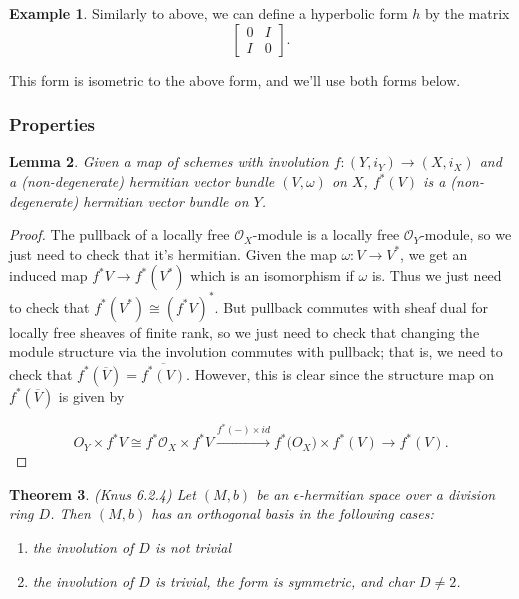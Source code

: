 \documentclass[draftthesis,tocnosub,noragright,centerchapter,10pt]{uiucthesis2009}
\newcommand{\mc}{\mathcal}
\theoremstyle{plain}
\newtheorem{lemma}{Lemma}
\newtheorem{theorem}[lemma]{Theorem}
\theoremstyle{definition}
\newtheorem{example}[lemma]{Example}
\begin{document}
\begin{example}
Similarly to above, we can define a hyperbolic form $h$ by the matrix
\[
\begin{bmatrix}
0 & I\\
I & 0
\end{bmatrix}.
\]

This form is isometric to the above form, and we'll use both forms below.
\end{example}

\subsubsection{Properties}

\begin{lemma}
Given a map of schemes with involution $f : (Y,i_Y) \rightarrow (X,i_X)$
and a (non-degenerate) hermitian vector bundle $(V,\omega)$ on $X$, $f^*(V)$ is
a (non-degenerate) hermitian
vector bundle on $Y$.
\end{lemma}


\begin{proof}
The pullback of a locally free $\mc O_X$-module is a locally free $\mc
O_Y$-module, so we just need to check that it's hermitian. Given the
map $\omega : V \rightarrow V^*$, we get an induced map $f^*V
\rightarrow f^*(V^*)$ which is an isomorphism if $\omega$ is. Thus we
just need to check that $f^*(V^*) \cong (f^*V)^*$. But pullback
commutes with sheaf dual for locally free sheaves of finite rank, so
we just need to check that changing the module structure via the
involution commutes with pullback; that is, we need to check that
$f^*(\overline V) = \overline{f^*(V)}$. However, this is clear since
the structure map on $f^*(\overline V)$ is given by

\[
O_Y \times f^*V \cong f^* \mc O_X \times f^*V \xrightarrow{f^*(-) \times id} f^*\mc(O_X) \times f^*(V)
\rightarrow f^*(V).
\]
\end{proof}

\begin{theorem} (Knus \cite{HermKnus} 6.2.4)
Let $(M,b)$ be an $\epsilon$-hermitian space over a division ring
$D$. Then $(M,b)$ has an orthogonal basis in the following cases:
\begin{enumerate}
\item the involution of $D$ is not trivial
\item the involution of $D$ is trivial, the form is symmetric, and
  char $D \neq 2$.
\end{enumerate}
\end{theorem}
\end{document}
